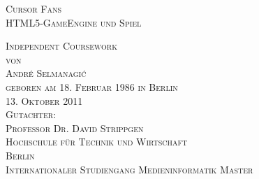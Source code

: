 \thispagestyle{empty}


\begin{center}

\vspace*{2cm}
\Large
\textsc{Cursor Fans}\\
\textsc{HTML5-GameEngine und Spiel}

\vspace{4cm}

\textsc{Independent Coursework\\[0.5\baselineskip]
von\\[0.5\baselineskip]
André Selmanagi\'{c}\\
{\normalsize \textsc{geboren am 18. Februar 1986 in Berlin}}}\\

\vspace{4cm}
\textsc{13. Oktober 2011}\\ %

\vspace{1cm}
\textsc{Gutachter:\\
Professor Dr. David Strippgen}\\

\vspace{1cm}
\textsc{Hochschule für Technik und Wirtschaft\\
Berlin\\
Internationaler Studiengang Medieninformatik Master}

\end{center}

\addtocounter{page}{-1}
